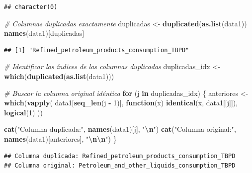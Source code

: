 \documentclass[
]{article}
\newenvironment{Shaded}{\begin{snugshade}}{\end{snugshade}}
\newcommand{\CommentTok}[1]{\textcolor[rgb]{0.56,0.35,0.01}{\textit{#1}}}
\newcommand{\ControlFlowTok}[1]{\textcolor[rgb]{0.13,0.29,0.53}{\textbf{#1}}}
\newcommand{\DecValTok}[1]{\textcolor[rgb]{0.00,0.00,0.81}{#1}}
\newcommand{\FunctionTok}[1]{\textcolor[rgb]{0.13,0.29,0.53}{\textbf{#1}}}
\newcommand{\NormalTok}[1]{#1}
\newcommand{\OtherTok}[1]{\textcolor[rgb]{0.56,0.35,0.01}{#1}}
\newcommand{\SpecialCharTok}[1]{\textcolor[rgb]{0.81,0.36,0.00}{\textbf{#1}}}
\newcommand{\StringTok}[1]{\textcolor[rgb]{0.31,0.60,0.02}{#1}}
\begin{document}
\begin{verbatim}
## character(0)
\end{verbatim}

\begin{Shaded}
\begin{Highlighting}[]
\CommentTok{\# Columnas duplicadas exactamente}
\NormalTok{duplicadas }\OtherTok{\textless{}{-}} \FunctionTok{duplicated}\NormalTok{(}\FunctionTok{as.list}\NormalTok{(data1))}
\FunctionTok{names}\NormalTok{(data1)[duplicadas]}
\end{Highlighting}
\end{Shaded}

\begin{verbatim}
## [1] "Refined_petroleum_products_consumption_TBPD"
\end{verbatim}

\begin{Shaded}
\begin{Highlighting}[]
\CommentTok{\# Identificar los índices de las columnas duplicadas}
\NormalTok{duplicadas\_idx }\OtherTok{\textless{}{-}} \FunctionTok{which}\NormalTok{(}\FunctionTok{duplicated}\NormalTok{(}\FunctionTok{as.list}\NormalTok{(data1)))}

\CommentTok{\# Buscar la columna original idéntica}
\ControlFlowTok{for}\NormalTok{ (j }\ControlFlowTok{in}\NormalTok{ duplicadas\_idx) \{}
\NormalTok{  anteriores }\OtherTok{\textless{}{-}} \FunctionTok{which}\NormalTok{(}\FunctionTok{vapply}\NormalTok{(}
\NormalTok{    data1[}\FunctionTok{seq\_len}\NormalTok{(j }\SpecialCharTok{{-}} \DecValTok{1}\NormalTok{)],}
    \ControlFlowTok{function}\NormalTok{(x) }\FunctionTok{identical}\NormalTok{(x, data1[[j]]),}
    \FunctionTok{logical}\NormalTok{(}\DecValTok{1}\NormalTok{)}
\NormalTok{  ))}
  
  \FunctionTok{cat}\NormalTok{(}\StringTok{"Columna duplicada:"}\NormalTok{, }\FunctionTok{names}\NormalTok{(data1)[j], }\StringTok{"}\SpecialCharTok{\textbackslash{}n}\StringTok{"}\NormalTok{)}
  \FunctionTok{cat}\NormalTok{(}\StringTok{"Columna original:"}\NormalTok{, }\FunctionTok{names}\NormalTok{(data1)[anteriores], }\StringTok{"}\SpecialCharTok{\textbackslash{}n\textbackslash{}n}\StringTok{"}\NormalTok{)}
\NormalTok{\}}
\end{Highlighting}
\end{Shaded}

\begin{verbatim}
## Columna duplicada: Refined_petroleum_products_consumption_TBPD 
## Columna original: Petroleum_and_other_liquids_consumption_TBPD
\end{verbatim}
\end{document}
